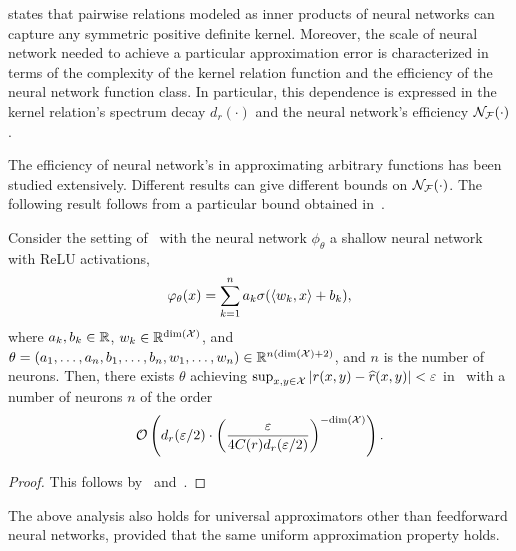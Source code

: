  states that pairwise relations modeled as inner products of neural networks can capture any symmetric positive definite kernel. Moreover, the scale of neural network needed to achieve a particular approximation error is characterized in terms of the complexity of the kernel relation function and the efficiency of the neural network function class. In particular, this dependence is expressed in the kernel relation's spectrum decay $d_r(\cdot)$ and the neural network's efficiency ${\mathcal{N}}_{\mathcal{F}}(\cdot)$.

The efficiency of neural network's in approximating arbitrary functions has been studied extensively. Different results can give different bounds on ${\mathcal{N}}_{\mathcal{F}}(\cdot)$. The following result follows from a particular bound obtained in~\parencite{poggioWhyWhenCan2017}.

\begin{corollary}
	Consider the setting of~ with the neural network $\phi_\theta$ a shallow neural network with ReLU activations,
	\begin{equation*}
		\phi_\theta(x) = \sum_{k=1}^{n} a_k \sigma(\iprod{w_k}{x} + b_k),
	\end{equation*}
	where $a_k, b_k \in \mathbb{R}$, $w_k \in \mathbb{R}^{\mathrm{dim}({\mathcal{X}})}$, and $\theta = (a_1, \ldots, a_n, b_1, \ldots, b_n, w_1, \ldots, w_n) \in \mathbb{R}^{n (\mathrm{dim}({\mathcal{X}}) + 2)}$, and $n$ is the number of neurons. Then, there exists $\theta$ achieving $\sup_{x,y \in \mathcal{X}}{\left\lvert r(x,y) - \widehat{r}(x,y)\right\rvert} < \varepsilon$ in~ with a number of neurons $n$ of the order 
	\[{\mathcal{O}}\left(d_r(\varepsilon / 2) \cdot \left(\frac{\varepsilon}{4 C(r) d_r(\varepsilon / 2)}\right)^{-\mathrm{dim}({\mathcal{X}})}\right).\]
\end{corollary}
\begin{proof}
	This follows by~ and~\parencite[Theorem 4]{poggioWhyWhenCan2017}.
\end{proof}



The above analysis also holds for universal approximators other than feedforward neural networks, provided that the same uniform approximation property holds.